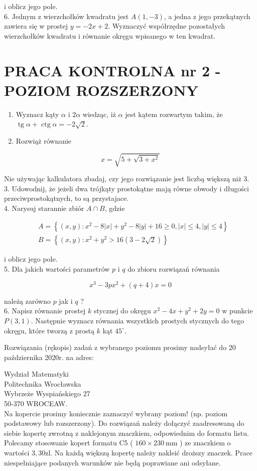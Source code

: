 \documentclass[10pt]{article}
\begin{document}
i oblicz jego pole.\\
6. Jednym z wierzchołków kwadratu jest $A(1,-3)$, a jedna z jego przekątnych zawiera się w prostej $y=-2 x+2$. Wyznaczyć współrzędne pozostałych wierzchołków kwadratu i równanie okręgu wpisanego w ten kwadrat.

\section*{PRACA KONTROLNA nr 2 - POZIOM ROZSZERZONY}
\begin{enumerate}
  \item Wyznacz kąty $\alpha$ i $2 \alpha$ wiedząc, iż $\alpha$ jest kątem rozwartym takim, że $\operatorname{tg} \alpha+\operatorname{ctg} \alpha=-2 \sqrt{2}$.
  \item Rozwiąż równanie
\end{enumerate}

$$
x=\sqrt{5+\sqrt{3+x^{2}}}
$$

Nie używając kalkulatora zbadaj, czy jego rozwiązanie jest liczbą większą niż 3.\\
3. Udowodnij, że jeżeli dwa trójkąty prostokątne mają równe obwody i długości przeciwprostokątnych, to są przystajace.\\
4. Narysuj starannie zbiór $A \cap B$, gdzie

$$
\begin{aligned}
& A=\left\{(x, y): x^{2}-8|x|+y^{2}-8|y|+16 \geqslant 0,|x| \leqslant 4,|y| \leqslant 4\right\} \\
& B=\left\{(x, y): x^{2}+y^{2}>16(3-2 \sqrt{2})\right\}
\end{aligned}
$$

i oblicz jego pole.\\
5. Dla jakich wartości parametrów $p$ i $q$ do zbioru rozwiązań równania

$$
x^{3}-3 p x^{2}+(q+4) x=0
$$

należą zarówno $p$ jak i $q$ ?\\
6. Napisz równanie prostej $k$ stycznej do okręgu $x^{2}-4 x+y^{2}+2 y=0$ w punkcie $P(3,1)$. Następnie wyznacz równania wszystkich prostych stycznych do tego okręgu, które tworzą z prostą $k$ kąt $45^{\circ}$.

Rozwiązania (rękopis) zadań z wybranego poziomu prosimy nadsyłać do 20 października 2020r. na adres:

Wydział Matematyki\\
Politechnika Wrocławska\\
Wybrzeże Wyspiańskiego 27\\
50-370 WROCEAW.\\
Na kopercie prosimy koniecznie zaznaczyć wybrany poziom! (np. poziom podstawowy lub rozszerzony). Do rozwiązań należy dołączyć zaadresowaną do siebie kopertę zwrotną z naklejonym znaczkiem, odpowiednim do formatu listu. Polecamy stosowanie kopert formatu C5 ( $160 \times 230 \mathrm{~mm}$ ) ze znaczkiem o wartości $3,30 \mathrm{zl}$. Na każdą większą kopertę należy nakleić droższy znaczek. Prace niespełniające podanych warunków nie będą poprawiane ani odsyłane.
\end{document}
